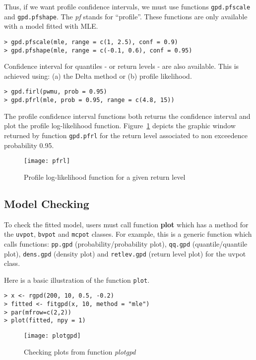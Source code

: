 \documentclass[11pt,a4paper]{article}
\numberwithin{equation}{section}
\theoremstyle{definition}
\begin{document}
Thus, if we want profile confidence intervals, we must use functions
\verb|gpd.pfscale| and \verb|gpd.pfshape|. The \emph{pf} stands for
``profile''. These functions are only available with a model fitted
with MLE.
\begin{verbatim}
> gpd.pfscale(mle, range = c(1, 2.5), conf = 0.9)
> gpd.pfshape(mle, range = c(-0.1, 0.6), conf = 0.95)
\end{verbatim}

Confidence interval for quantiles - or return levels - are also
available. This is achieved using: (a) the Delta method or (b) profile
likelihood.
\begin{verbatim}
> gpd.firl(pwmu, prob = 0.95)
> gpd.pfrl(mle, prob = 0.95, range = c(4.8, 15))
\end{verbatim}

The profile confidence interval functions both returns the confidence
interval and plot the profile log-likelihood
function. Figure~\ref{fig:pfrl} depicts the graphic window returned by
function \verb|gpd.pfrl| for the return level associated to non
exceedence probability 0.95.
\begin{figure}
  \centering
  \texttt{[image: pfrl]}
  \caption{Profile log-likelihood function for a given return level}
  \label{fig:pfrl}
\end{figure}

\subsection{Model Checking}
\label{subsec:modCheck}


To check the fitted model, users must call function \textbf{plot}
which has a method for the \verb|uvpot|, \verb|bvpot| and \verb|mcpot|
classes. For example, this is a generic function which calls
functions: \verb|pp.gpd| (probability/probability plot), \verb|qq.gpd|
(quantile/quantile plot), \verb|dens.gpd| (density plot) and
\verb|retlev.gpd| (return level plot) for the uvpot class.

Here is a basic illustration of the function \verb|plot|.
\begin{verbatim}
> x <- rgpd(200, 10, 0.5, -0.2)
> fitted <- fitgpd(x, 10, method = "mle")
> par(mfrow=c(2,2))
> plot(fitted, npy = 1)
\end{verbatim}

\begin{figure}
  \centering
  \texttt{[image: plotgpd]}
  \caption{Checking plots from function \emph{plotgpd}}
  \label{fig:plotgpd}
\end{figure}
\end{document}
